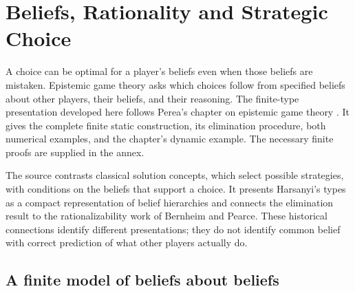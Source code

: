 \chapter{Beliefs, Rationality and Strategic Choice}
\label{sec:p17-epistemic-game-theory}

A choice can be optimal for a player's beliefs even when those beliefs
are mistaken. Epistemic game theory asks which choices follow from
specified beliefs about other players, their beliefs, and their
reasoning. The finite-type presentation developed here follows Perea's
chapter on epistemic game theory
\cite[chap.~9.2, pp.~543--551]{Perea2021EpistemicGameTheory}.
It gives the complete finite static construction, its elimination
procedure, both numerical examples, and the chapter's dynamic example.
The necessary finite proofs are supplied in the annex.

The source contrasts classical solution concepts, which select possible
strategies, with conditions on the beliefs that support a choice.
It presents Harsanyi's types as a compact representation of belief
hierarchies and connects the elimination result to the rationalizability
work of Bernheim and Pearce. These historical connections identify
different presentations; they do not identify common belief with
correct prediction of what other players actually do.

\section{A finite model of beliefs about beliefs}

